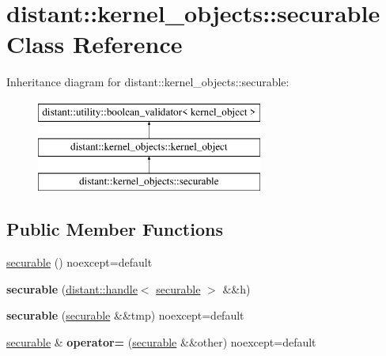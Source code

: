 \hypertarget{classdistant_1_1kernel__objects_1_1securable}{}\section{distant\+:\+:kernel\+\_\+objects\+:\+:securable Class Reference}
\label{classdistant_1_1kernel__objects_1_1securable}
Inheritance diagram for distant\+:\+:kernel\+\_\+objects\+:\+:securable\+:\begin{figure}[H]
\begin{center}
\leavevmode
\includegraphics[height=3.000000cm]{classdistant_1_1kernel__objects_1_1securable}
\end{center}
\end{figure}
\subsection*{Public Member Functions}
\begin{DoxyCompactItemize}
\item 
\mbox{\hyperlink{classdistant_1_1kernel__objects_1_1securable_aec5d135541fe36243d7ec121e5bd36fa}{securable}} () noexcept=default
\item 
\mbox{\label{classdistant_1_1kernel__objects_1_1securable_a83e1362b9c3c2264603c91d1640a6683}} 
{\bfseries securable} (\mbox{\hyperlink{classdistant_1_1handle}{distant\+::handle}}$<$ \mbox{\hyperlink{classdistant_1_1kernel__objects_1_1securable}{securable}} $>$ \&\&h)
\item 
\mbox{\label{classdistant_1_1kernel__objects_1_1securable_aadf38da104d9aa1b6a66c0a042450d39}} 
{\bfseries securable} (\mbox{\hyperlink{classdistant_1_1kernel__objects_1_1securable}{securable}} \&\&tmp) noexcept=default
\item 
\mbox{\label{classdistant_1_1kernel__objects_1_1securable_aab9d9f6f85afd6295b031fe18f0ee821}} 
\mbox{\hyperlink{classdistant_1_1kernel__objects_1_1securable}{securable}} \& {\bfseries operator=} (\mbox{\hyperlink{classdistant_1_1kernel__objects_1_1securable}{securable}} \&\&other) noexcept=default
\end{DoxyCompactItemize}
